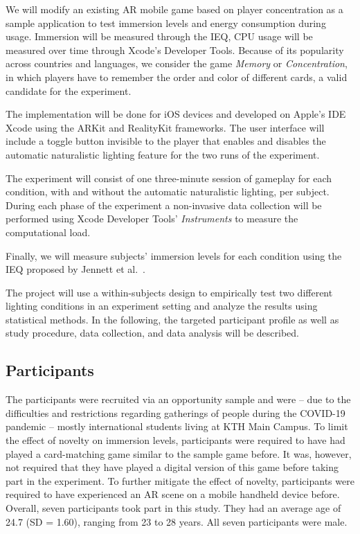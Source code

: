 \documentclass[12pt,twoside,english]{article}
\begin{document}
We will modify an existing \gls{AR} mobile game based on player concentration as a sample application to test immersion levels and energy consumption during usage.
Immersion will be measured through the \gls{IEQ}, \gls{CPU} usage will be measured over time through Xcode's Developer Tools.
Because of its popularity across countries and languages, we consider the game \textit{Memory} or \textit{Concentration}, in which players have to remember the order and color of different cards, a valid candidate for the experiment.

The implementation will be done for iOS devices and developed on Apple's \gls{IDE} Xcode using the ARKit and RealityKit frameworks.
The user interface will include a toggle button invisible to the player that enables and disables the automatic naturalistic lighting feature for the two runs of the experiment.

The experiment will consist of one three-minute session of gameplay for each condition, with and without the automatic naturalistic lighting, per subject.
During each phase of the experiment a non-invasive data collection will be performed using Xcode Developer Tools' \emph{Instruments} to measure the computational load.

Finally, we will measure subjects' immersion levels for each condition using the \gls{IEQ} proposed by Jennett et al.~\cite{jennett_measuring_2008}.

The project will use a within-subjects design to empirically test two different lighting conditions in an experiment setting and analyze the results using statistical methods.
In the following, the targeted participant profile as well as study procedure, data collection, and data analysis will be described.

\subsection{Participants}
\label{sect:participants}

The participants were recruited via an opportunity sample and were -- due to the difficulties and restrictions regarding gatherings of people during the COVID-19 pandemic -- mostly international students living at KTH Main Campus.
To limit the effect of novelty on immersion levels, participants were required to have had played a card-matching game similar to the sample game before.
It was, however, not required that they have played a digital version of this game before taking part in the experiment.
To further mitigate the effect of novelty, participants were required to have experienced an \gls{AR} scene on a mobile handheld device before.
Overall, seven participants took part in this study.
They had an average age of 24.7 (SD = 1.60), ranging from 23 to 28 years.
All seven participants were male.
\end{document}

